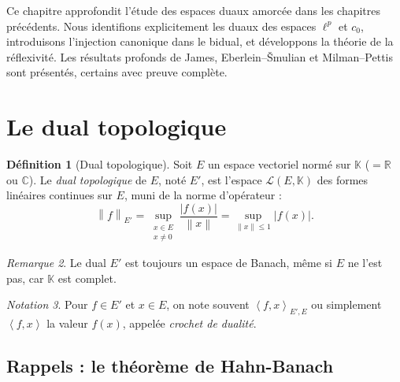 \documentclass[a4paper,12pt]{book}
\newcommand{\R}{\mathbb{R}}
\newcommand{\C}{\mathbb{C}}
\newcommand{\K}{\mathbb{K}}
\newcommand{\norm}[1]{\left\| #1 \right\|}
\newcommand{\abs}[1]{\left| #1 \right|}
\newcommand{\inner}[2]{\left\langle #1, #2 \right\rangle}
\theoremstyle{definition}
\newtheorem{definition}{Définition}[chapter]
\theoremstyle{plain}
\theoremstyle{remark}
\newtheorem{remarque}[definition]{Remarque}
\newtheorem{notation}[definition]{Notation}
\begin{document}
\vspace{1em}

Ce chapitre approfondit l'étude des espaces duaux
amorcée dans les chapitres précédents. Nous identifions explicitement les duaux
des espaces $\ell^p$ et $c_0$, introduisons
l'injection canonique dans le bidual, et
développons la théorie de la réflexivité. Les résultats
profonds de James, Eberlein--\v{S}mulian
et Milman--Pettis sont présentés, certains avec preuve complète.

\section{Le dual topologique}
\label{sec:dual-topologique}


\begin{definition}[Dual topologique]
\label{def:dual-topologique}
Soit $E$ un espace vectoriel normé sur $\K$ ($= \R$ ou $\C$).
Le \emph{dual topologique} de $E$, noté $E'$, est l'espace
$\mathcal{L}(E, \K)$ des formes linéaires continues sur $E$,
muni de la norme d'opérateur :
\[
  \norm{f}_{E'} = \sup_{\substack{x \in E \\ x \neq 0}} \frac{\abs{f(x)}}{\norm{x}}
  = \sup_{\norm{x} \le 1} \abs{f(x)}.
\]
\end{definition}

\begin{remarque}
\label{rem:dual-banach}
Le dual $E'$ est toujours un espace de Banach, même si $E$
ne l'est pas, car $\K$ est complet.
\end{remarque}

\begin{notation}
\label{not:crochet-dualite}
Pour $f \in E'$ et $x \in E$, on note souvent
$\inner{f}{x}_{E',E}$ ou simplement $\inner{f}{x}$
la valeur $f(x)$, appelée \emph{crochet de dualité}.
\end{notation}

\subsection{Rappels : le théorème de Hahn-Banach}
\label{subsec:rappel-hahn-banach}
\end{document}
